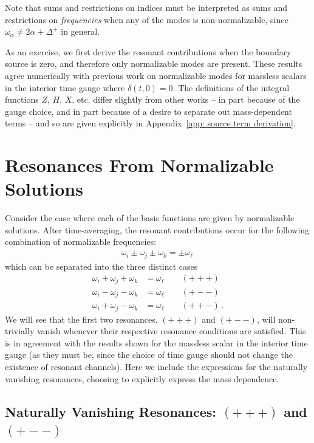 \documentclass[letterpaper,11pt]{article}
\newcommand{\oi}{\omega_i}
\newcommand{\oj}{\omega_j}
\newcommand{\ok}{\omega_k}
\newcommand{\ol}{\omega_\ell}
\begin{document}
Note that sums and restrictions on indices must be interpreted as sums and restrictions on \emph{frequencies} when any of the modes is non-normalizable, since $\omega_\alpha \neq 2 \alpha + \Delta^+$ in general.

As an exercise, we first derive the resonant contributions when the boundary source is zero, and therefore only normalizable modes are present. These results agree numerically with previous work on normalizable modes for massless scalars in the interior time gauge where $\delta(t, 0) = 0$. The definitions of the integral functions $Z$, $H$, $X$, etc. differ slightly from other works -- in part because of the gauge choice, and in part because of a desire to separate out mass-dependent terms -- and so are given explicitly in Appendix~\ref{app: source term derivation}.


\section{Resonances From Normalizable Solutions}
\label{sec: norm res}
Consider the case where each of the basis functions are given by normalizable solutions. After time-averaging, the  resonant contributions occur for the following combination of normalizable frequencies: 
\begin{align}
\label{gen res}
\oi \pm \oj \pm \ok = \pm \ol \,
\end{align}
which can be separated into the three distinct cases
\begin{align}
\oi + \oj + \ok &= \ol \qquad (+++) \\
\oi - \oj - \ok &= \ol \qquad (+--) \\
\oi + \oj - \ok &= \ol \qquad (++-) \, .
\end{align}
We will see that the first two resonances, $(+++)$ and $(+--)$, will non-trivially vanish whenever their respective resonance conditions are satisfied. This is in agreement with the results shown for the massless scalar in the interior time gauge (as they must be, since the choice of time gauge should not change the existence of resonant channels). Here we include the expressions for the naturally vanishing resonances, choosing to explicitly express the mass dependence.


\subsection{Naturally Vanishing Resonances: $(+++)$ and $(+--)$}
\label{ssec: zero resonance}
\end{document}
